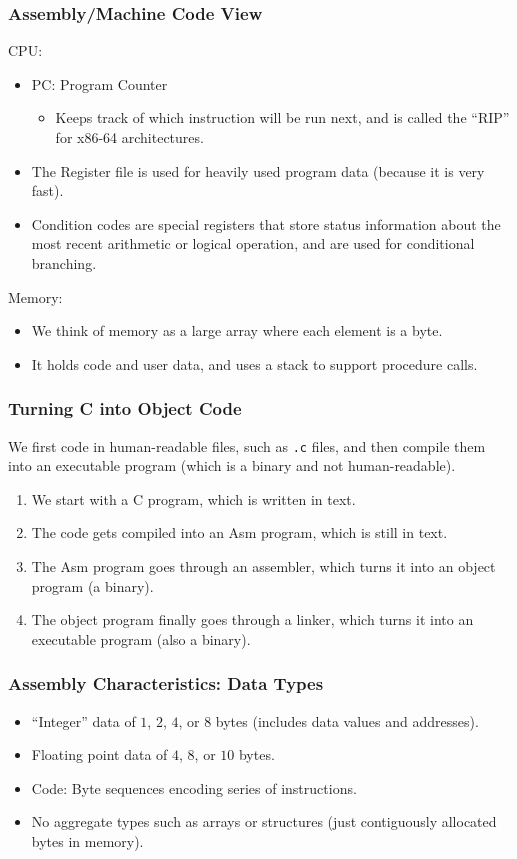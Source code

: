 \documentclass[class=article, crop=false]{standalone}
\begin{document}
  \subsubsection{Assembly/Machine Code View}
  CPU:
  \begin{itemize}
    \item PC: Program Counter
    \begin{itemize}
      \item Keeps track of which instruction will be run next, and is called the ``RIP'' for x86-64 architectures.
    \end{itemize}
    \item The Register file is used for heavily used program data (because it is very fast).
    \item Condition codes are special registers that store status information about the most recent arithmetic or logical operation, and are used for conditional branching.
  \end{itemize}
  Memory:
  \begin{itemize}
    \item We think of memory as a large array where each element is a byte.
    \item It holds code and user data, and uses a stack to support procedure calls.
  \end{itemize}
  \begin{center}\end{center}
  \subsubsection{Turning C into Object Code}
  We first code in human-readable files, such as \texttt{.c} files, and then compile them into an executable program (which is a binary and not human-readable).
  \begin{enumerate}
    \item We start with a C program, which is written in text.
    \item The code gets compiled into an Asm program, which is still in text.
    \item The Asm program goes through an assembler, which turns it into an object program (a binary).
    \item The object program finally goes through a linker, which turns it into an executable program (also a binary).
  \end{enumerate}
  \subsubsection{Assembly Characteristics: Data Types}
  \begin{itemize}
    \item ``Integer'' data of $1$, $2$, $4$, or $8$ bytes (includes data values and addresses).
    \item Floating point data of $4$, $8$, or $10$ bytes.
    \item Code: Byte sequences encoding series of instructions.
    \item No aggregate types such as arrays or structures (just contiguously allocated bytes in memory).
  \end{itemize}
\end{document}
